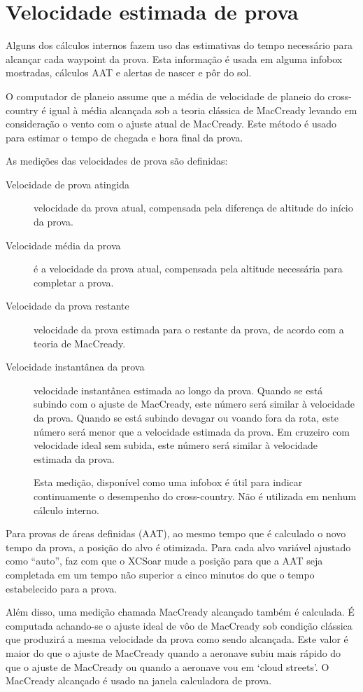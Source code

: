 \section{Velocidade estimada de prova}\label{sec:task-speed-estim}

Alguns dos cálculos internos fazem uso das estimativas do tempo necessário para alcançar cada waypoint da prova.  Esta informação é usada em alguma infobox mostradas, cálculos AAT e alertas de nascer e pôr do sol.

O computador de planeio assume que a média de velocidade de planeio do cross-country é igual à média alcançada sob a teoria clássica de MacCready levando em consideração o vento com o ajuste atual de MacCready.  Este método é usado para estimar o tempo de chegada e hora final da prova.  


As medições das velocidades de prova são definidas:
\begin{description}
\item[Velocidade de prova atingida]  velocidade da prova atual, compensada pela diferença de altitude do início da prova.
\item[Velocidade média da prova]  é a velocidade da prova atual, compensada pela altitude necessária para completar a prova.
\item[Velocidade da prova restante] velocidade da prova estimada para o restante da prova, de acordo com a teoria de MacCready.
\item[Velocidade instantânea da prova]  velocidade instantânea estimada ao longo da prova.  Quando se está subindo com o ajuste de MacCready, este número será similar à velocidade da prova.  Quando se está subindo devagar ou voando fora da rota, este número será menor que a velocidade estimada da prova.  Em cruzeiro com velocidade ideal sem subida, este número será similar à velocidade estimada da prova.

Esta medição, disponível como uma infobox é útil para indicar continuamente o desempenho do cross-country.  Não é utilizada em nenhum cálculo interno.
\end{description}

Para provas de áreas definidas (AAT), ao mesmo tempo que é calculado o novo tempo da prova, a posição do alvo é otimizada.  Para cada alvo variável ajustado como “auto”, faz com que o XCSoar mude a posição para que a AAT seja completada em um tempo não superior a cinco minutos do que o tempo estabelecido para a prova.

Além disso, uma medição chamada MacCready alcançado também é calculada.  É computada achando-se o ajuste ideal de vôo de MacCready sob condição clássica que produzirá a mesma velocidade da prova como sendo alcançada.  Este valor é maior do que o ajuste de MacCready quando a aeronave subiu mais rápido do que o ajuste de MacCready ou quando a aeronave vou em ‘cloud streets’.  O MacCready alcançado é usado na janela calculadora de prova.

